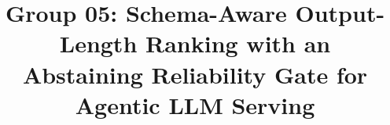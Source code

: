 \documentclass[conference]{IEEEtran}
\begin{document}
\title{Group 05: Schema-Aware Output-Length Ranking with an Abstaining
Reliability Gate for Agentic LLM Serving}

\author{
}

\maketitle









\clearpage

\clearpage



\end{document}

